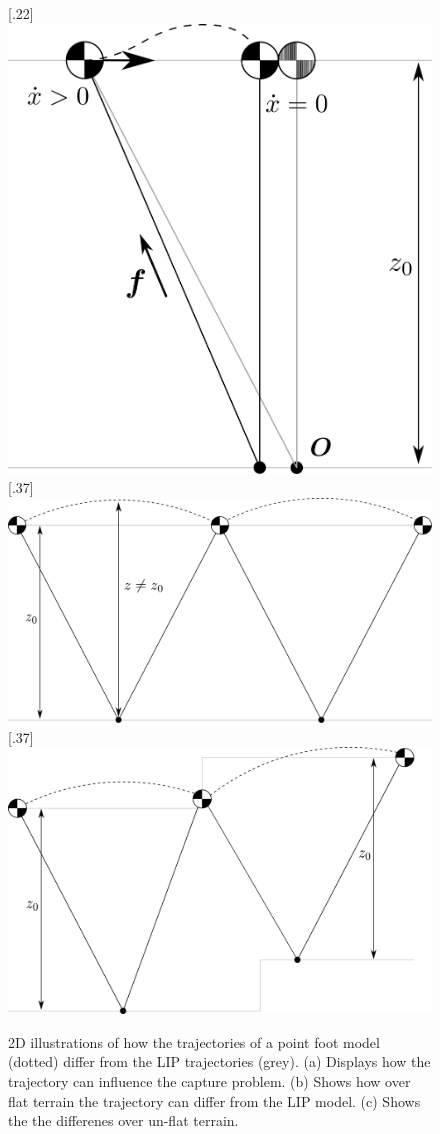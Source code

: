 \begin{figure}[h]
\centering
\subcaptionbox{\label{fig:hcp}}[.22\textwidth]{\includegraphics[width=0.8\linewidth]{STYLESTUFF/VaryingHeightCP.png}}
\hfill
\subcaptionbox{\label{fig:flat}}[.37\textwidth]{\includegraphics[width=0.88\linewidth]{STYLESTUFF/VaryingHeightflat.png}}
\hfill
\subcaptionbox{\label{fig:unflat}}[.37\textwidth]{\includegraphics[width=0.88\linewidth]{STYLESTUFF/VaryingHeightunflat.png}}
\label{fig:varheight}
\caption{\ac{2D} illustrations of how the trajectories of a point foot model (dotted) differ from the \ac{LIP} trajectories (grey). (a) Displays how the trajectory can influence the capture problem. (b) Shows how over flat terrain the trajectory can differ from the \ac{LIP} model. (c) Shows the the differenes over un-flat terrain.}
\end{figure}

